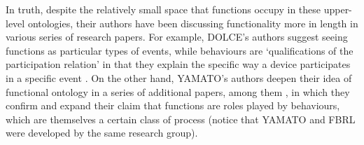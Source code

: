 \documentclass[sw]{iosart2x}
\newcommand{\DOLCE}{\textsc{DOLCE}\xspace} %
\newcommand{\YAMATO}{\textsc{YAMATO}\xspace}
\newcommand{\myComment}[1]{{\unskip \ignorespaces}}
\begin{document}
In truth, despite the relatively small space that functions occupy in these upper-level ontologies, their authors have been discussing functionality more in length in various series of research papers. 
For example, \DOLCE's authors suggest seeing functions as particular types of events, while behaviours are `qualifications of the participation relation' in that they explain the specific way a device participates in a specific event \cite{borgoCapabilitiesCapacitiesFunctionalities2021,borgoFormalizationFunctionsOperations2011, garbaczTwoOntologydrivenFormalisations2011}. %
On the other hand, \YAMATO's authors deepen their idea of functional ontology in a series of additional papers, among them \cite{kitamuraOntologicalModelDevice2006, kitamuraCharacterizingFunctionsBased2013, mizoguchiFunctionalOntologyArtifacts2009}, in which they confirm and expand their claim that functions are roles played by behaviours, which are themselves a certain class of process (notice that \YAMATO \myComment{'s authors are same research group behind FBRL development} and FBRL were developed by the same research group).
\end{document}
